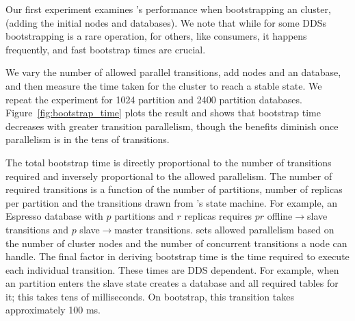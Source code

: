 Our first experiment examines \helix's performance when bootstrapping an \ES cluster,
(\ie adding the initial nodes and databases).  We note that while for some DDSs
bootstrapping is a rare operation, for others, like \databus consumers, it
happens frequently, and fast bootstrap times are crucial.

We vary the number of allowed parallel transitions, add nodes and an \ES
database, and then measure the time taken for the cluster to reach a stable
state.  We repeat the experiment for 1024 partition and 2400 partition
databases. 
Figure~\ref{fig:bootstrap_time} plots the result and shows that bootstrap time
decreases with greater transition parallelism, though the benefits diminish once
parallelism is in the tens of transitions.

The total bootstrap time is directly proportional to the number of transitions
required and inversely proportional to the allowed parallelism.  The number of
required transitions is a function of the number of partitions, number of
replicas per partition and the transitions drawn from \ES's state machine.
For example, an Espresso database with $p$ partitions and $r$ replicas requires
$pr$ offline$\rightarrow$slave transitions and $p$ slave$\rightarrow$master
transitions.  \ES sets allowed parallelism based on the number of cluster nodes
and the number of concurrent transitions a node can handle.
The final factor in deriving bootstrap time is the time required to execute each
individual transition.  These times are DDS dependent. 
For example, when an \ES partition enters the slave state \ES creates a \mysql
database and all required tables for it; this takes tens of milliseconds.
On bootstrap, this transition takes approximately 100 ms.  

